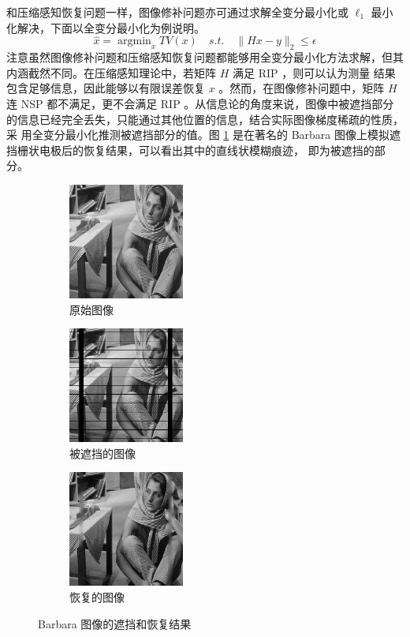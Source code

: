 和压缩感知恢复问题一样，图像修补问题亦可通过求解全变分最小化或 $\ell_1$
最小化解决，下面以全变分最小化为例说明。
\begin{equation}
\hat x = \mathop{\arg\min}_{x} TV(x) \quad s.t. \quad
\|Hx - y\|_2 \leq \epsilon
\end{equation}
注意虽然图像修补问题和压缩感知恢复问题都能够用全变分最小化方法求解，但其
内涵截然不同。在压缩感知理论中，若矩阵 $H$ 满足 RIP ，则可以认为测量
结果包含足够信息，因此能够以有限误差恢复 $x$ 。然而，在图像修补问题中，矩阵
$H$ 连 NSP 都不满足，更不会满足 RIP 。从信息论的角度来说，图像中被遮挡部分
的信息已经完全丢失，只能通过其他位置的信息，结合实际图像梯度稀疏的性质，采
用全变分最小化推测被遮挡部分的值。图 \ref{fig:BarbaraMask} 是在著名的
Barbara 图像上模拟遮挡栅状电极后的恢复结果，可以看出其中的直线状模糊痕迹，
即为被遮挡的部分。

\begin{figure}
\centering
\begin{subfigure}[t]{1.5in}
\includegraphics[width=1.5in]{Figure/barbara.png}
\caption{原始图像}
\end{subfigure}
\begin{subfigure}[t]{1.5in}
\includegraphics[width=1.5in]{Figure/barbara_mask.png}
\caption{被遮挡的图像}
\end{subfigure}
\begin{subfigure}[t]{1.5in}
\includegraphics[width=1.5in]{Figure/barbara_out.png}
\caption{恢复的图像}
\end{subfigure}
\caption{Barbara 图像的遮挡和恢复结果}
\label{fig:BarbaraMask}
\end{figure}

